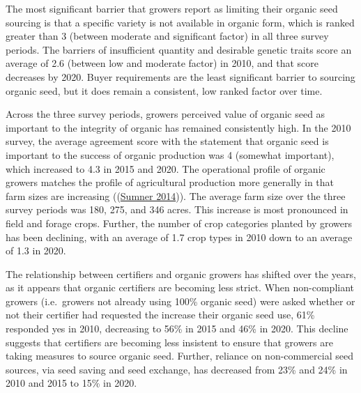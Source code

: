 \documentclass[twoside,12pt,final]{ucthesis-CA2012}
\begin{document}
\begin{ucmainmatter}
The most significant barrier that growers report as limiting their
organic seed sourcing is that a specific variety is not available in
organic form, which is ranked greater than 3 (between moderate and
significant factor) in all three survey periods. The barriers of
insufficient quantity and desirable genetic traits score an average of
2.6 (between low and moderate factor) in 2010, and that score decreases
by 2020. Buyer requirements are the least significant barrier to
sourcing organic seed, but it does remain a consistent, low ranked
factor over time.

Across the three survey periods, growers\textquotesingle{} perceived value of organic
seed as important to the integrity of organic has remained consistently
high. In the 2010 survey, the average agreement score with the statement
that organic seed is important to the success of organic production was
4 (somewhat important), which increased to 4.3 in 2015 and 2020. The
operational profile of organic growers matches the profile of
agricultural production more generally in that farm sizes are increasing
((\protect\hyperlink{ref-Sumner_2014}{Sumner 2014})). The average
farm size over the three survey periods was 180, 275, and 346 acres.
This increase is most pronounced in field and forage crops. Further, the
number of crop categories planted by growers has been declining, with an
average of 1.7 crop types in 2010 down to an average of 1.3 in 2020.

The relationship between certifiers and organic growers has shifted over
the years, as it appears that organic certifiers are becoming less
strict. When non-compliant growers (i.e.~growers not already using 100\%
organic seed) were asked whether or not their certifier had requested
the increase their organic seed use, 61\% responded yes in 2010,
decreasing to 56\% in 2015 and 46\% in 2020. This decline suggests that
certifiers are becoming less insistent to ensure that growers are taking
measures to source organic seed. Further, reliance on non-commercial
seed sources, via seed saving and seed exchange, has decreased from 23\%
and 24\% in 2010 and 2015 to 15\% in 2020.
\begin{table}


\end{table}
\end{ucmainmatter}
\end{document}
